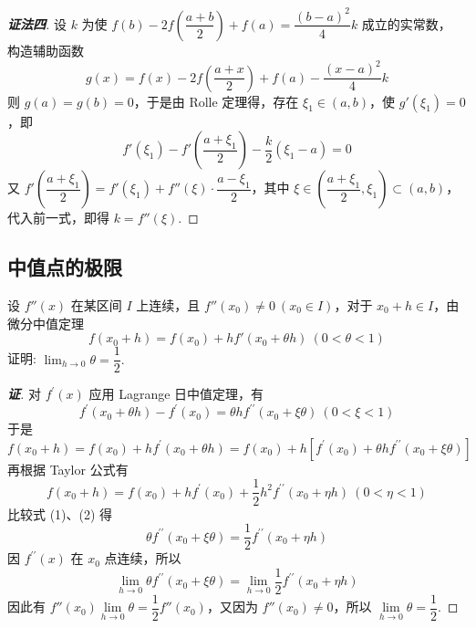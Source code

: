 \begin{proof}[{\songti \textbf{证法四}}]
    设 $k$ 为使 $f(b)-2f\left(\dfrac{a+b}{2}\right)+f(a)=\dfrac{(b-a)^{2}}{4}k$ 成立的实常数，
    构造辅助函数 $$g(x)=f(x)-2f\left(\dfrac{a+x}{2}\right)+f(a)-\dfrac{(x-a)^{2}}{4}k$$
    则 $g(a)=g(b)=0$，于是由 Rolle 定理得，存在 $\xi_{1}\in(a,b)$，使 $g'(\xi_{1})=0$，即 $$f'(\xi_{1})-f'\left(\dfrac{a+\xi_{1}}{2}\right)-\dfrac{k}{2}(\xi_{1}-a)=0$$
    又 $f'\left(\dfrac{a+\xi_{1}}{2}\right)=f'(\xi_{1})+f''(\xi)\cdot\dfrac{a-\xi_{1}}{2}$，其中 $\xi\in\left(\dfrac{a+\xi_{1}}{2},\xi_{1}\right)\subset(a,b)$，
    代入前一式，即得 $k=f''(\xi)$.
\end{proof}

\subsection{中值点的极限}

\begin{example}
    设 $f''(x)$ 在某区间 $I$ 上连续，且 $f''(x_0)\neq0~ (x_0\in I)$，对于 $x_0+h\in I$，由微分中值定理
    $$f(x_0+h)  =f(x_0)  +hf'(x_{0}+\theta h)  ~ ( 0 <\theta  < 1) $$
    证明: $\displaystyle\lim_{h\to0}\theta=\dfrac{1}{2}.$
\end{example}
\begin{proof}[{\songti \textbf{证}}]
    对 $f^{\prime}(x)$  应用 Lagrange 日中值定理，有
    $$f^{\prime}\left(x_{0}+\theta h\right)-f^{\prime}(x_0) =\theta h f^{\prime \prime}(x_0+\xi \theta)  ~ (0<\xi<1)$$
    于是
    \begin{equation}
        f\left(x_{0}+h\right)=f(x_0) +h f^{\prime}\left(x_{0}+\theta h\right)=f(x_0) +h\left[f^{\prime}(x_0) +\theta h f^{\prime \prime}(x_0+\xi \theta) \right]\tag{1}
    \end{equation}
    再根据 Taylor 公式有
    \begin{equation}
        f\left(x_{0}+h\right)=f(x_0) +h f^{\prime}(x_0) +\dfrac{1}{2} h^{2} f^{\prime \prime}\left(x_{0}+\eta h\right) ~ (0<\eta<1)\tag{2}
    \end{equation}
    比较式 (1)、(2) 得
    $$\theta f^{\prime \prime}(x_0+\xi \theta) =\dfrac{1}{2} f^{\prime \prime}\left(x_{0}+\eta h\right)$$
    因 $f^{\prime \prime}(x)$ 在 $x_{0}$ 点连续，所以
    $$\lim _{h \rightarrow 0} \theta f^{\prime \prime}(x_0+\xi \theta) =\lim _{h \rightarrow 0} \dfrac{1}{2} f^{\prime \prime}\left(x_{0}+\eta h\right)$$
    因此有 $f''(x_0)\lim\limits_{h\to0}\theta=\dfrac{1}{2}f''(x_0)$，又因为 $f''(x_0)\neq0$，所以 $\lim\limits_{h\to0}\theta=\dfrac{1}{2}.$
\end{proof}

